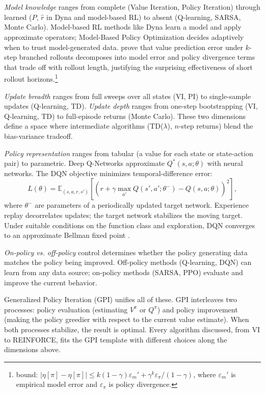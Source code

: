 \emph{Model knowledge} ranges from complete (Value Iteration, Policy Iteration) through learned ($\hat{P}$, $\hat{r}$ in Dyna and model-based RL) to absent (Q-learning, SARSA, Monte Carlo). Model-based RL methods like Dyna \citep{sutton2018} learn a model and apply approximate operators; Model-Based Policy Optimization \citep{janner2019model} decides adaptively when to trust model-generated data. \citet{janner2019model} prove that value prediction error under $k$-step branched rollouts decomposes into model error and policy divergence terms that trade off with rollout length, justifying the surprising effectiveness of short rollout horizons.\footnote{\citet{janner2019model} bound: $|\eta[\pi] - \hat{\eta}[\pi]| \leq k(1-\gamma)\varepsilon_m' + \gamma^k \varepsilon_\pi / (1-\gamma)$, where $\varepsilon_m'$ is empirical model error and $\varepsilon_\pi$ is policy divergence.}

\emph{Update breadth} ranges from full sweeps over all states (VI, PI) to single-sample updates (Q-learning, TD). \emph{Update depth} ranges from one-step bootstrapping (VI, Q-learning, TD) to full-episode returns (Monte Carlo). These two dimensions define a space where intermediate algorithms (TD($\lambda$), $n$-step returns) blend the bias-variance tradeoff.

\emph{Policy representation} ranges from tabular (a value for each state or state-action pair) to parametric. Deep Q-Networks \citep{mnih2015} approximate $Q^*(s,a; \theta)$ with neural networks. The DQN objective minimizes temporal-difference error:
\begin{equation}
L(\theta) = \mathbb{E}_{(s,a,r,s')} \left[ \left( r + \gamma \max_{a'} Q(s', a'; \theta^-) - Q(s, a; \theta) \right)^2 \right],
\end{equation}
where $\theta^-$ are parameters of a periodically updated target network. Experience replay decorrelates updates; the target network stabilizes the moving target. Under suitable conditions on the function class and exploration, DQN converges to an approximate Bellman fixed point \citep{fan2020dqn}.

\emph{On-policy vs. off-policy} control determines whether the policy generating data matches the policy being improved. Off-policy methods (Q-learning, DQN) can learn from any data source; on-policy methods (SARSA, PPO) evaluate and improve the current behavior.

Generalized Policy Iteration (GPI) unifies all of these. GPI interleaves two processes: policy evaluation (estimating $V^\pi$ or $Q^\pi$) and policy improvement (making the policy greedier with respect to the current value estimate). When both processes stabilize, the result is optimal. Every algorithm discussed, from VI to REINFORCE, fits the GPI template with different choices along the dimensions above.

